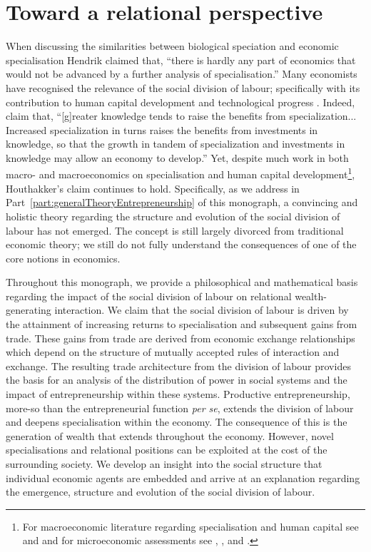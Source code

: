 \chapter{Toward a relational perspective} 
\label{ch:relationalperspective}

When discussing the similarities between biological speciation and economic specialisation Hendrik \citet[p.~182]{Houthakker1956} claimed that, ``there is hardly any part of economics that would not be advanced by a further analysis of specialisation.'' Many economists have recognised the relevance of the social division of labour; specifically with its contribution to human capital development and technological progress \citep{Liang2014}. Indeed, \citet[p.~1157]{BeckerMurphy1992} claim that, ``[g]reater knowledge tends to raise the benefits from specialization... Increased specialization in turns raises the benefits from investments in knowledge, so that the growth in tandem of specialization and investments in knowledge may allow an economy to develop.'' Yet, despite much work in both macro- and macroeconomics on specialisation and human capital development\footnote{For macroeconomic literature regarding specialisation and human capital see \citet{Rosen1983} and \citet{Lucas1988} and for microeconomic assessments see \citet{YangBorland1991}, \citet{YangShi1992}, and \citet{ChengYang2004}.}, Houthakker's claim continues to hold. Specifically, as we address in Part~\ref{part:generalTheoryEntrepreneurship} of this monograph, a convincing and holistic theory regarding the structure and evolution of the social division of labour has not emerged. The concept is still largely divorced from traditional economic theory; we still do not fully understand the consequences of one of the core notions in economics.

Throughout this monograph, we provide a philosophical and mathematical basis regarding the impact of the social division of labour on relational wealth-generating interaction. We claim that the social division of labour is driven by the attainment of increasing returns to specialisation and subsequent gains from trade. These gains from trade are derived from economic exchange relationships which depend on the structure of mutually accepted rules of interaction and exchange. The resulting trade architecture from the division of labour provides the basis for an analysis of the distribution of power in social systems and the impact of entrepreneurship within these systems. Productive entrepreneurship, more-so than the entrepreneurial function \emph{per se}, extends the division of labour and deepens specialisation within the economy. The consequence of this is the generation of wealth that extends throughout the economy. However, novel specialisations and relational positions can be exploited at the cost of the surrounding society. We develop an insight into the social structure that individual economic agents are embedded and arrive at an explanation regarding the emergence, structure and evolution of the social division of labour. 

